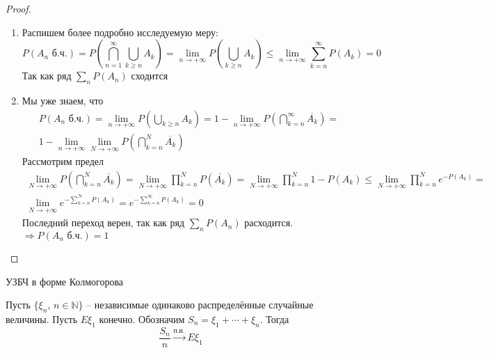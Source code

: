 \begin{proof}
	\begin{enumerate}
		\item Распишем более подробно исследуемую меру:
		      \[P(A_n \text{ б.ч.}) = P\left(\bigcap_{n = 1}^\infty \bigcup_{k \geq n} A_k\right) = \lim_{n \to +\infty} P\left(\bigcup_{k \geq n}A_k\right) \leq \lim_{n \to +\infty} \sum_{k = n}^\infty P(A_k) = 0\]
		      Так как ряд $\sum_n P(A_n)$ сходится
		\item Мы уже знаем, что
		      \begin{align*}
			      P(A_n \text{ б.ч.}) = \lim_{n \to +\infty} P\left(\bigcup_{k \geq n} A_k\right) = 1 - \lim_{n \to +\infty}P\left(\bigcap_{k = n}^\infty \overline{A_k}\right) = \\
			      1 - \lim_{n \to +\infty}\lim_{N \to +\infty} P(\bigcap_{k = n}^N \overline{A_k})
		      \end{align*}
		      Рассмотрим предел
		      \begin{align*}
			      \lim_{N \to +\infty}P\left(\bigcap_{k = n}^N \overline{A_k}\right) = \lim_{N \to +\infty} \prod_{k = n}^N P\left(\overline{A_k}\right) = \lim_{N \to +\infty} \prod_{k = n}^N 1 - P(A_k) \leq \lim_{N \to +\infty} \prod_{k = n}^N e^{-P(A_k)} = \\
			      \lim_{N \to +\infty} e^{-\sum_{k = n}^N P(A_k)} = e^{-\sum_{k = n}^\infty P(A_k)} = 0
		      \end{align*}
		      Последний переход верен, так как ряд $\sum_n P(A_n)$ расходится. $\Rightarrow P(A_n \text{ б.ч.}) = 1$
	\end{enumerate}
\end{proof}

\begin{theorem}
	УЗБЧ в форме Колмогорова

	Пусть $\{\xi_n,\, n \in \mathbb{N}\}$ -- независимые одинаково распределённые случайные величины. Пусть $E\xi_1$ конечно. Обозначим $S_n = \xi_1 + \cdots + \xi_n$. Тогда
	\[\frac{S_n}{n} \stackrel{\text{п.н.}}{\to} E\xi_1\]
\end{theorem}

